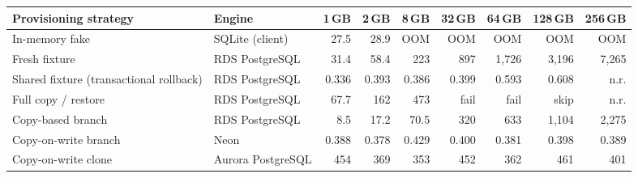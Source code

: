 \begin{tabular}{@{}llrrrrrrr@{}}
\toprule
Provisioning strategy & Engine & 1\,GB & 2\,GB & 8\,GB & 32\,GB & 64\,GB & 128\,GB & 256\,GB \\
\midrule
In-memory fake & SQLite (client) & 27.5 & 28.9 & OOM & OOM & OOM & OOM & OOM \\
Fresh fixture & RDS PostgreSQL & 31.4 & 58.4 & 223 & 897 & 1{,}726 & 3{,}196 & 7{,}265 \\
Shared fixture (transactional rollback) & RDS PostgreSQL & 0.336 & 0.393 & 0.386 & 0.399 & 0.593 & 0.608 & n.r. \\
Full copy / restore & RDS PostgreSQL & 67.7 & 162 & 473 & fail & fail & skip & n.r. \\
Copy-based branch & RDS PostgreSQL & 8.5 & 17.2 & 70.5 & 320 & 633 & 1{,}104 & 2{,}275 \\
Copy-on-write branch & Neon & 0.388 & 0.378 & 0.429 & 0.400 & 0.381 & 0.398 & 0.389 \\
Copy-on-write clone & Aurora PostgreSQL & 454 & 369 & 353 & 452 & 362 & 461 & 401 \\
\bottomrule
\end{tabular}
